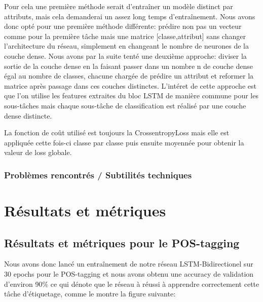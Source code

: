 \documentclass[a4paper]{article}
\begin{document}
Pour cela une première méthode serait d'entraîner un modèle distinct par attributs, mais cela demanderai un 
assez long temps d'entraînement. Nous avons donc opté pour une première méthode différente: prédire non pas un 
vecteur comme pour la première tâche mais une matrice [classe,attribut] sans changer l'architecture du réseau, 
simplement en changeant le nombre de neurones de la couche dense. Nous avons par la suite tenté une deuxième 
approche: diviser la sortie de la couche dense en la faisant passer dans un nombre n de couche dense égal au 
nombre de classes, chacune chargée de prédire un attribut et reformer la matrice après passage dans ces couches 
distinctes. L'intéret de cette approche est que l'on utilise les features extraites du bloc LSTM de manière 
commune pour les sous-tâches mais chaque sous-tâche de classification est réalisé par une couche dense distincte.

La fonction de coût utilisé est toujours la CrossentropyLoss mais elle est appliquée cette fois-ci classe par 
classe puis ensuite moyennée pour obtenir la valeur de loss globale.

\subsubsection{Problèmes rencontrés / Subtilités techniques}



\section{Résultats et métriques}


\subsection{Résultats et métriques pour le POS-tagging}
Nous avons donc lancé un entraînement de notre réseau LSTM-Bidirectionel sur 30 epochs pour le POS-tagging et 
nous avons obtenu une accuracy de validation d'environ 90\% ce qui dénote que le réseau à réussi à apprendre 
correctement cette tâche d'étiquetage, comme le montre la figure suivante:
\end{document}

